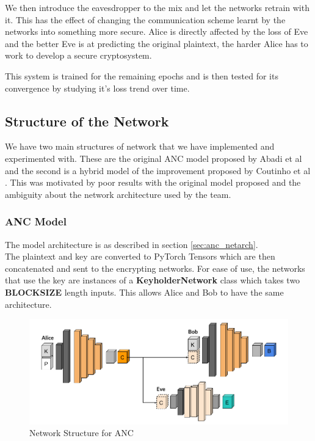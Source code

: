 \documentclass[a4paper]{article}
\begin{document}
    We then introduce the eavesdropper to the mix and let the networks retrain with it. This has the effect
    of changing the communication scheme learnt by the networks into something more secure. Alice is
    directly affected by the loss of Eve and the better Eve is at predicting the original plaintext, the
    harder Alice has to work to develop a secure cryptosystem.

    This system is trained for the remaining epochs and is then tested for its convergence by studying
    it's loss trend over time.

    \subsection{Structure of the Network}
    We have two main structures of network that we have implemented and experimented with. These are
    the original ANC model proposed by Abadi et al \cite{seminalanc} and the second is a hybrid model
    of the improvement proposed by Coutinho et al \cite{perfanc}. This was motivated by poor results
    with the original model proposed and the ambiguity about the network architecture used by the team.
      
      \pagebreak
      \subsubsection{ANC Model}
      The model architecture is as described in section \ref{sec:anc_netarch}.\\
      The plaintext and key are converted to PyTorch Tensors which are then concatenated and sent
      to the encrypting networks. For ease of use, the networks that use the key are instances of a 
      {\bfseries KeyholderNetwork} class which takes two {\bfseries BLOCKSIZE} length inputs.
      This allows Alice and Bob to have the same architecture.

      \begin{figure}[H]
        \centering
        \includegraphics[width=\textwidth]{../ref/ancstruct.png}
        \caption{Network Structure for ANC}
        \label{fig:ancstruct}
      \end{figure}
\end{document}
